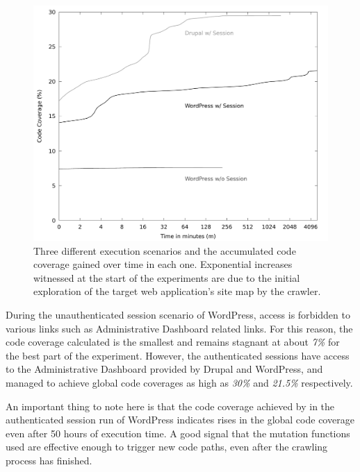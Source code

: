 \begin{figure}[!htb]
  \centering \includegraphics[width=\linewidth]{figures/plot_coverage.pdf}
  \caption{Three different execution scenarios and the accumulated code coverage gained over time in each one. Exponential increases witnessed at the start of the experiments are due to the initial exploration of the target web application's site map by the crawler.} 
  \label{fig:plot_coverage}
\end{figure}

During the unauthenticated session scenario of WordPress, access is forbidden to various links such as Administrative Dashboard related links. For this reason, the code coverage calculated is the smallest and remains stagnant at about \emph{7\%} for the best part of the experiment. However, the authenticated sessions have access to the Administrative Dashboard provided by Drupal and WordPress, and managed to achieve global code coverages as high as \emph{30\%} and \emph{21.5\%} respectively. 

An important thing to note here is that the code coverage achieved by \pname{} in the authenticated session run of WordPress indicates rises in the global code coverage even after 50 hours of execution time. A good signal that the mutation functions used are effective enough to trigger new code paths, even after the crawling process has finished.
 
